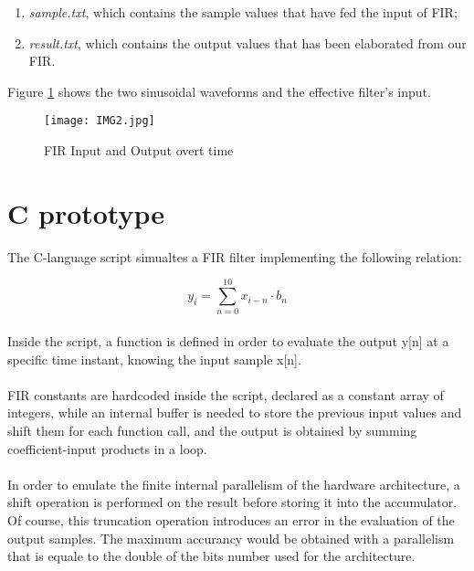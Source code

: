 \begin{enumerate}
	\item \emph{sample.txt}, which contains the sample values that have fed the input of FIR;
	\item \emph{result.txt}, which contains the output values that has been elaborated from our FIR.
\end{enumerate}

Figure \ref{fig:2} shows the two sinusoidal waveforms and the effective filter's input.
\begin{figure}[!ht]
	\caption{FIR Input and Output overt time}
	\label{fig:2}
	\texttt{[image: IMG2.jpg]}
	\centering
\end{figure}


\section{C prototype}

The C-language script simualtes a FIR filter implementing the following  relation:

\begin{displaymath}[!h]
y_i = \sum_{n=0}^{10}{x_{i-n} \cdot b_n}
\end{displaymath}
\paragraph{}
Inside the script, a function is defined in order to evaluate the output y[n] at a specific time instant, knowing the input sample x[n].
\paragraph{}
FIR constants are hardcoded inside the script, declared as a constant array of integers, while an internal buffer is needed to store the previous input values and shift them for each function call, and the output is obtained by summing coefficient-input products in a loop.
\paragraph{}
In order to emulate the finite internal parallelism of the hardware architecture, a shift operation is performed on the result before storing it into the accumulator.
Of course, this truncation operation introduces an error in the evaluation of the output samples.
The maximum accurancy would be obtained with a parallelism that is equale to the double of the bits number used for the architecture.


